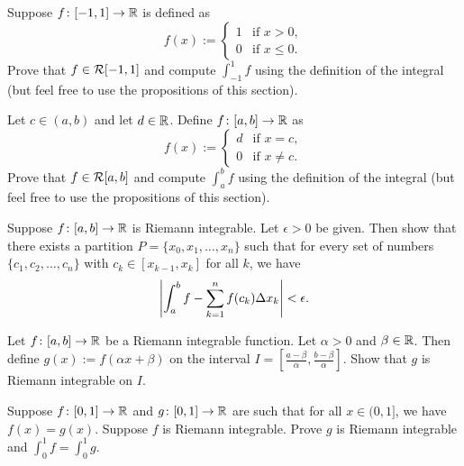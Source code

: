 \begin{exercise}
Suppose $f \colon [-1,1] \to {\mathbb{R}}$ is defined as
\begin{equation*}
f(x) :=
\begin{cases}
1 & \text{if } x > 0, \\
0 & \text{if } x \leq 0.
\end{cases}
\end{equation*}
Prove that $f \in {\mathcal{R}}[-1,1]$ and
compute $\int_{-1}^1 f$ using the definition of the integral
(but
feel free to use the propositions of this section).
\end{exercise}

\begin{exercise}
Let $c \in (a,b)$ and let $d \in {\mathbb{R}}$.
Define $f \colon [a,b] \to {\mathbb{R}}$ as
\begin{equation*}
f(x) :=
\begin{cases}
d & \text{if } x = c, \\
0 & \text{if } x \not= c.
\end{cases}
\end{equation*}
Prove that $f \in {\mathcal{R}}[a,b]$ and
compute
$\int_a^b f$ using the definition of the integral
(but
feel free to use the propositions of this section).
\end{exercise}

\begin{exercise} \label{exercise:taggedpartition}
Suppose $f \colon [a,b] \to {\mathbb{R}}$ is Riemann integrable.  Let $\epsilon
> 0$ be given.  Then show that there exists a partition $P = \{ x_0, x_1,
\ldots, x_n \}$
such that for every
set of numbers $\{ c_1, c_2, \ldots, c_n \}$ with
$c_k \in [x_{k-1},x_k]$ for all $k$, we have
\begin{equation*}
\left\lvert {\int_a^b f - \sum_{k=1}^n f(c_k) \Delta x_k} \right\rvert < \epsilon .
\end{equation*}
\end{exercise}

\begin{exercise}
Let $f \colon [a,b] \to {\mathbb{R}}$ be a Riemann integrable function.
Let $\alpha > 0$ and $\beta \in {\mathbb{R}}$.
Then define $g(x) := f(\alpha x + \beta)$ on the interval
$I = [\frac{a-\beta}{\alpha}, \frac{b-\beta}{\alpha}]$.  Show
that $g$ is Riemann integrable on $I$.
\end{exercise}

\begin{exercise}
Suppose $f \colon [0,1] \to {\mathbb{R}}$ and $g \colon [0,1] \to {\mathbb{R}}$
are such that for all $x \in (0,1]$,
we have $f(x) = g(x)$.  Suppose $f$ is Riemann integrable. 
Prove $g$ is Riemann integrable and $\int_{0}^1 f = \int_{0}^1 g$.
\end{exercise}

